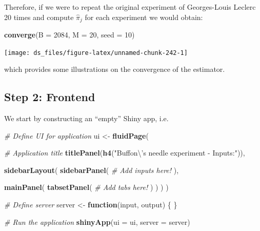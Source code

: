 \documentclass[12pt,]{krantz}
\newenvironment{Shaded}{\begin{snugshade}}{\end{snugshade}}
\newcommand{\KeywordTok}[1]{\textcolor[rgb]{0.27,0.27,0.27}{\textbf{#1}}}
\newcommand{\DataTypeTok}[1]{\textcolor[rgb]{0.27,0.27,0.27}{#1}}
\newcommand{\DecValTok}[1]{\textcolor[rgb]{0.06,0.06,0.06}{#1}}
\newcommand{\CharTok}[1]{\textcolor[rgb]{0.5,0.5,0.5}{#1}}
\newcommand{\StringTok}[1]{\textcolor[rgb]{0.5,0.5,0.5}{#1}}
\newcommand{\CommentTok}[1]{\textcolor[rgb]{0.37,0.37,0.37}{\textit{#1}}}
\newcommand{\ControlFlowTok}[1]{\textcolor[rgb]{0.27,0.27,0.27}{\textbf{#1}}}
\newcommand{\NormalTok}[1]{#1}
\begin{document}
Therefore, if we were to repeat the original experiment of Georges-Louis
Leclerc 20 times and compute \(\hat{\pi}_j\) for each experiment we
would obtain:

\begin{Shaded}
\begin{Highlighting}[]
\KeywordTok{converge}\NormalTok{(}\DataTypeTok{B =} \DecValTok{2084}\NormalTok{, }\DataTypeTok{M =} \DecValTok{20}\NormalTok{, }\DataTypeTok{seed =} \DecValTok{10}\NormalTok{)}
\end{Highlighting}
\end{Shaded}

\begin{center}\texttt{[image: ds\_files/figure-latex/unnamed-chunk-242-1]} \end{center}

which provides some illustrations on the convergence of the estimator.

\subsection{Step 2: Frontend}\label{step-2-frontend}

We start by constructing an ``empty'' Shiny app, i.e.

\begin{Shaded}
\begin{Highlighting}[]
\CommentTok{# Define UI for application}
\NormalTok{ui <-}\StringTok{ }\KeywordTok{fluidPage}\NormalTok{(}
  
  \CommentTok{# Application title}
  \KeywordTok{titlePanel}\NormalTok{(}\KeywordTok{h4}\NormalTok{(}\StringTok{"Buffon}\CharTok{\textbackslash{}'}\StringTok{s needle experiment - Inputs:"}\NormalTok{)),}
  
  \KeywordTok{sidebarLayout}\NormalTok{(}
    \KeywordTok{sidebarPanel}\NormalTok{(}
      \CommentTok{# Add inputs here!}
\NormalTok{    ),}
    
    \KeywordTok{mainPanel}\NormalTok{(}
      \KeywordTok{tabsetPanel}\NormalTok{(}
        \CommentTok{# Add tabs here!}
\NormalTok{      )}
\NormalTok{    )}
\NormalTok{  )}
\NormalTok{)}

\CommentTok{# Define server}
\NormalTok{server <-}\StringTok{ }\ControlFlowTok{function}\NormalTok{(input, output) \{}
\NormalTok{\}}

\CommentTok{# Run the application }
\KeywordTok{shinyApp}\NormalTok{(}\DataTypeTok{ui =}\NormalTok{ ui, }\DataTypeTok{server =}\NormalTok{ server)}
\end{Highlighting}
\end{Shaded}
\end{document}
